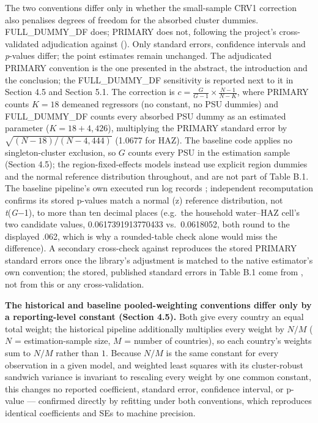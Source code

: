 The two conventions differ only in whether the small-sample CRV1 correction also penalises degrees of freedom for the absorbed cluster dummies. FULL\_DUMMY\_DF does; PRIMARY does not, following the project's cross-validated adjudication against  \autocite{Sheppard2025Linearmodels} (). Only standard errors, confidence intervals and \emph{p}-values differ; the point estimates remain unchanged. The adjudicated PRIMARY convention is the one presented in the abstract, the introduction and the conclusion; the FULL\_DUMMY\_DF sensitivity is reported next to it in Section 4.5 and Section 5.1. The correction is \(c = \frac{G}{G-1}\times\frac{N-1}{N-K}\), where PRIMARY counts \(K=18\) demeaned regressors (no constant, no PSU dummies) and FULL\_DUMMY\_DF counts every absorbed PSU dummy as an estimated parameter (\(K = 18+4{,}426\)), multiplying the PRIMARY standard error by \(\sqrt{(N-18)/(N-4{,}444)}\) (1.0677 for HAZ). The baseline code applies no singleton-cluster exclusion, so \(G\) counts every PSU in the estimation sample (Section 4.5); the region-fixed-effects models instead use explicit region dummies and the normal reference distribution throughout, and are not part of Table B.1. The baseline pipeline's own executed run log records ; independent recomputation confirms its stored p-values match a normal (z) reference distribution, not \emph{t}(\emph{G}−1), to more than ten decimal places (e.g.~the household water--HAZ cell's two candidate values, 0.0617391913770433 vs.~0.0618052, both round to the displayed .062, which is why a rounded-table check alone would miss the difference). A secondary cross-check against  reproduces the stored PRIMARY standard errors once the library's  adjustment is matched to the native estimator's own convention; the stored, published standard errors in Table B.1 come from , not from this or any  cross-validation.

\textbf{The historical and baseline pooled-weighting conventions differ only by a reporting-level constant (Section 4.5).} Both give every country an equal total weight; the historical pipeline additionally multiplies every weight by \(N/M\) (\(N\) = estimation-sample size, \(M\) = number of countries), so each country's weights sum to \(N/M\) rather than \(1\). Because \(N/M\) is the same constant for every observation in a given model, and weighted least squares with its cluster-robust sandwich variance is invariant to rescaling every weight by one common constant, this changes no reported coefficient, standard error, confidence interval, or p-value --- confirmed directly by refitting under both conventions, which reproduces identical coefficients and SEs to machine precision.

